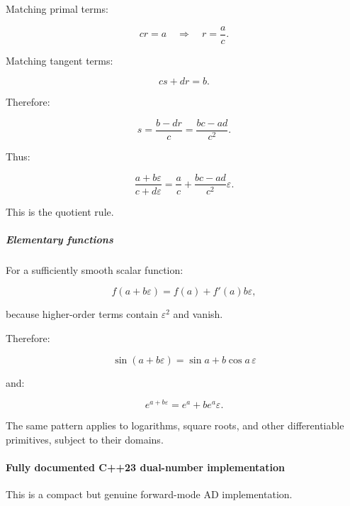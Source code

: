 Matching primal terms:

\[
cr=a \quad\Longrightarrow\quad r=\frac ac.
\]

Matching tangent terms:

\[
cs+dr=b.
\]

Therefore:

\[
s=\frac{b-dr}{c} =\frac{bc-ad}{c^2}.
\]

Thus:

\[
\boxed{ \frac{a+b\varepsilon}{c+d\varepsilon} = \frac ac+ \frac{bc-ad}{c^2}\varepsilon }.
\]

This is the quotient rule.

\subparagraph{Elementary functions}\label{elementary-functions}

For a sufficiently smooth scalar function:

\[
f(a+b\varepsilon) = f(a)+f'(a)b\varepsilon,
\]

because higher-order terms contain \(\varepsilon^2\) and vanish.

Therefore:

\[
\boxed{ \sin(a+b\varepsilon) = \sin a+b\cos a\,\varepsilon }
\]

and:

\[
\boxed{ e^{a+b\varepsilon} = e^a+be^a\varepsilon }.
\]

The same pattern applies to logarithms, square roots, and other differentiable primitives, subject to their domains.

\paragraph{Fully documented C++23 dual-number implementation}\label{fully-documented-c23-dual-number-implementation}

This is a compact but genuine forward-mode AD implementation.

